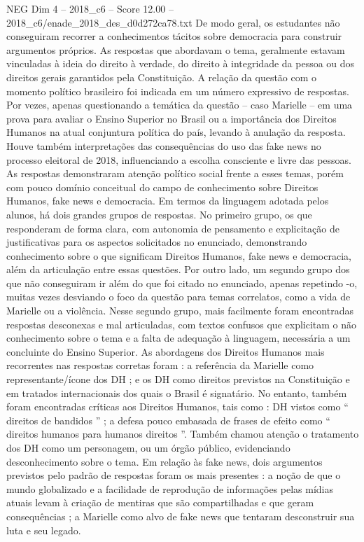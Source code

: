 \begin{textsample}{NEG Dim 4 – 2018\_c6 – Score 12.00 – 2018\_c6/enade\_2018\_des\_d0d272ca78.txt}
De modo geral, os estudantes não conseguiram recorrer a conhecimentos tácitos sobre democracia para construir argumentos próprios.
As respostas que abordavam o tema, geralmente estavam vinculadas à ideia do direito à verdade, do direito à integridade da pessoa ou dos direitos gerais garantidos pela Constituição.
A relação da questão com o momento político brasileiro foi indicada em um número expressivo de respostas.
Por vezes, apenas questionando a temática da questão – caso Marielle – em uma prova para avaliar o Ensino Superior no Brasil ou a importância dos Direitos Humanos na atual conjuntura política do país, levando à anulação da resposta.
Houve também interpretações das consequências do uso das fake news no processo eleitoral de 2018, influenciando a escolha consciente e livre das pessoas.
As respostas demonstraram atenção político social frente a esses temas, porém com pouco domínio conceitual do campo de conhecimento sobre Direitos Humanos, fake news e democracia.
Em termos da linguagem adotada pelos alunos, há dois grandes grupos de respostas.
No primeiro grupo, os que responderam de forma clara, com autonomia de pensamento e explicitação de justificativas para os aspectos solicitados no enunciado, demonstrando conhecimento sobre o que significam Direitos Humanos, fake news e democracia, além da articulação entre essas questões.
Por outro lado, um segundo grupo dos que não conseguiram ir além do que foi citado no enunciado, apenas repetindo -o, muitas vezes desviando o foco da questão para temas correlatos, como a vida de Marielle ou a violência.
Nesse segundo grupo, mais facilmente foram encontradas respostas desconexas e mal articuladas, com textos confusos que explicitam o não conhecimento sobre o tema e a falta de adequação à linguagem, necessária a um concluinte do Ensino Superior.
As abordagens dos Direitos Humanos mais recorrentes nas respostas corretas foram : a referência da Marielle como representante/ícone dos DH ; e os DH como direitos previstos na Constituição e em tratados internacionais dos quais o Brasil é signatário.
No entanto, também foram encontradas críticas aos Direitos Humanos, tais como : DH vistos como “ direitos de bandidos ” ; a defesa pouco embasada de frases de efeito como “ direitos humanos para humanos direitos ”.
Também chamou atenção o tratamento dos DH como um personagem, ou um órgão público, evidenciando desconhecimento sobre o tema.
Em relação às fake news, dois argumentos previstos pelo padrão de respostas foram os mais presentes : a noção de que o mundo globalizado e a facilidade de reprodução de informações pelas mídias atuais levam à criação de mentiras que são compartilhadas e que geram consequências ; a Marielle como alvo de fake news que tentaram desconstruir sua luta e seu legado.

\end{textsample}
